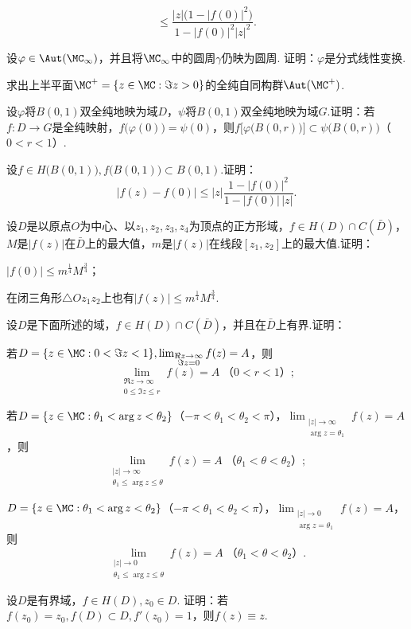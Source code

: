 \begin{xiti}
\[\le\frac{|z|\big(1-|f(0)|^2\big)}{1-|f(0)|^2|z|^2}.\]
\item 设$\varphi\in\Aut(\MC_\infty)$，并且将$\MC_\infty$中的圆周$\gamma$仍映为圆周. 证明：$\varphi$是分式线性变换.
\item 求出上半平面$\MC^+=\{z\in \MC:\Im z>0\}$的全纯自同构群$\Aut(\MC^+)$.
\item 设$\varphi$将$B(0,1)$双全纯地映为域$D$，$\psi$将$B(0,1)$双全纯地映为域$G$.证明：若$f:D\to G$是全纯映射，$f\big(\varphi(0)\big)=\psi(0)$，则$f\big[\varphi\big(B(0,r)\big)\big]
    \subset \psi\big(B(0,r)\big)$（$0<r<1$）.
\item 设$f\in H\big(B(0,1)\big),f\big(B(0,1)\big)\subset B(0,1)$.证明：
\[|f(z)-f(0)|\le|z|\frac{1-|f(0)|^2}{1-|f(0)|\,|z|}.\]
\item 设$D$是以原点$O$为中心、以$z_1,z_2,z_3,z_4$为顶点的正方形域，$f\in H(D)\cap C(\bar D)$，$M$是$|f(z)|$在$\bar D$上的最大值，$m$是$|f(z)|$在线段$[z_1,z_2]$上的最大值.证明：
\begin{enuma}
  \item $|f(0)|\le m^{\frac14}M^{\frac34}$；
  \item 在闭三角形$\triangle Oz_1z_2$上也有$|f(z)|\le m^{\frac14}M^{\frac34}$.
\end{enuma}
\item 设$D$是下面所述的域，$f\in H(D)\cap C(\bar D)$，并且在$\bar D$上有界.证明：
\begin{enuma}
  \item 若$D=\{z\in\MC:0<\Im z<1\},\lim_{\substack{\Re z\to\infty\\\Im z=0}}f(z)=A$，则
      \[\lim_{\substack{\Re z\to\infty\\0\le\Im z\le r}}f(z)=A\;\mbox{（$0<r<1$）};\]
  \item 若$D=\{z\in \MC:\theta_1<\arg z<\theta_2\}$（$-\pi<\theta_1<\theta_2<\pi$），$\lim_{\substack{|z|\to\infty\\
      \arg z=\theta_1}}f(z)=A$，则
      \[\lim_{\substack{|z|\to\infty\\\theta_1\le\arg z\le\theta}}f(z)=A\;\mbox{（$\theta_1<\theta<\theta_2$）};\]
  \item $D=\{z\in \MC:\theta_1<\arg z<\theta_2\}$（$-\pi<\theta_1<\theta_2<\pi$），$\lim_{\substack{|z|\to0\\
      \arg z=\theta_1}}f(z)=A$，则
      \[\lim_{\substack{|z|\to0\\\theta_1\le\arg z\le\theta}}f(z)=A\;\mbox{（$\theta_1<\theta<\theta_2$）}.\]
\end{enuma}
\item 设$D$是有界域，$f\in H(D),z_0\in D$. 证明：若$f(z_0)=z_0,f(D)\subset D,f'(z_0)=1$，则$f(z)\equiv z$.

\end{xiti}
